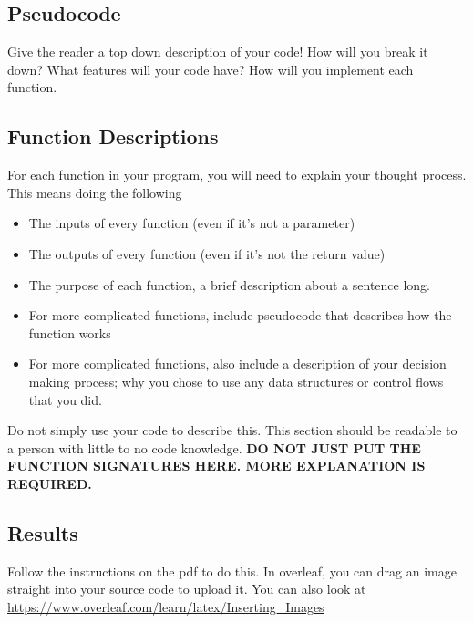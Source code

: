 \documentclass{article}
\begin{document}
\subsection*{Pseudocode}
Give the reader a top down description of your code! How will you break it down? What features will your code have? 
How will you implement each function. 

\subsection*{Function Descriptions}
For each function in your program, you will need to explain your thought process. This means doing the following
\begin{itemize}
    \item The inputs of every function (even if it's not a parameter)
    \item The outputs of every function (even if it's not the return value)
    \item The purpose of each function, a brief description about a sentence long. 
    \item For more complicated functions, include pseudocode that describes how the function works
    \item For more complicated functions, also include a description of your decision making process; why you chose to use any data structures or control flows that you did.
\end{itemize}
Do not simply use your code to describe this. This section should be readable to a person with little to no code knowledge. 
\textbf{DO NOT JUST PUT THE FUNCTION SIGNATURES HERE. MORE EXPLANATION IS REQUIRED.}

\subsection*{Results}
Follow the instructions on the pdf to do this. 
In overleaf, you can drag an image straight into your source code to upload it. You can also look at \url{https://www.overleaf.com/learn/latex/Inserting_Images}


\end{document}
